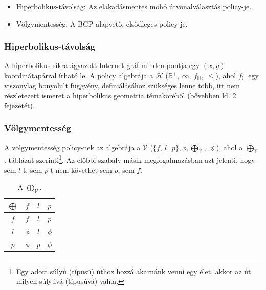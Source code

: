   \begin{itemize}
    \item Hiperbolikus-távolság: Az elakadásmentes mohó útvonalválasztás policy-je.
    \item Völgymentesség: A BGP alapvető, elsődleges policy-je.
  \end{itemize}

      \subsubsection{Hiperbolikus-távolság}
      A hiperbolikus síkra ágyazott Internet gráf minden pontja egy $(x,y)$ koordinátapárral írható le. A policy algebrája a $\mathcal{H}$ ($\mathbb{R}^{+},~\infty,~f_{\mathbb{H}},~\leq$), ahol $f_{\mathbb{H}}$ egy viszonylag bonyolult függvény, definiálásához szükséges lenne több, itt nem részletezett ismeret a hiperbolikus geometria témaköréből (bővebben ld.\cite{Thurston97} 2. fejezetét).

      \subsubsection{Völgymentesség}
      A völgymentesség policy-nek az algebrája a $\mathcal{V}$ ($\{f,~l,~p\},\phi,\bigoplus_{\mathcal{V}},\preceq$), ahol a $\bigoplus_{\mathcal{V}}$ . táblázat szerinti\footnote{ Egy adott súlyú (típusú) úthoz hozzá akarnánk venni egy élet, akkor az út milyen súlyúvá (típusúvá) válna.}. Az előbbi szabály másik megfogalmazásban azt jelenti, hogy sem $l$-t, sem $p$-t nem követhet sem $p$, sem $f$.

      \begin{table}[ht]
        \footnotesize
        \centering
        \caption{A $\bigoplus_{\mathcal{V}}$\cite{Compact_Policy_Routing}.}
        \begin{tabular}{ c | c c c }
          $\bigoplus$ & $f$ & $l$ & $p$\\
          \hline
          $f$ & $f$ & $l$ & $p$\\
          $l$ & $\phi$ & $l$ & $\phi$\\
          $p$ & $\phi$ & $p$ & $\phi$\\
        \end{tabular}\label{tab:szumma_tab}
      \end{table}

